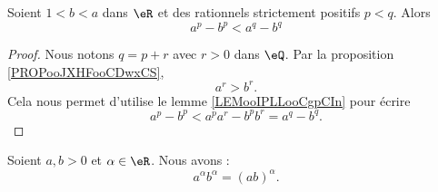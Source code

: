 \begin{corollary}       \label{CORooYWNNooLwKmiD}
    Soient \( 1<b<a\) dans \( \eR\) et des rationnels strictement positifs \( p<q\). Alors
    \begin{equation}
        a^p-b^p<a^q-b^q
    \end{equation}
\end{corollary}

\begin{proof}
    Nous notons \( q=p+r\) avec \( r>0\) dans \( \eQ\). Par la proposition \ref{PROPooJXHFooCDwxCS},
    \begin{equation}
        a^r>b^r.
    \end{equation}
    Cela nous permet d'utilise le lemme \ref{LEMooIPLLooCgpCIn} pour écrire
    \begin{equation}
        a^p-b^p<a^pa^r-b^pb^r=a^q-b^q.
    \end{equation}
\end{proof}

\begin{proposition}      \label{PROPooKWRGooMTbRdU}
    Soient \( a,b>0\) et \( \alpha\in \eR\). Nous avons :
    \begin{equation}
        a^{\alpha}b^{\alpha}=(ab)^{\alpha}.
    \end{equation}
\end{proposition}

